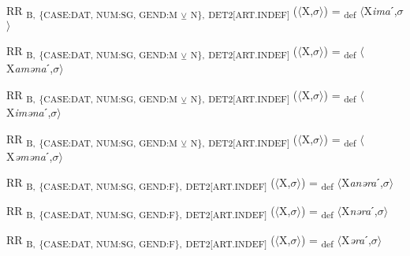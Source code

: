 {\begin{exe}
 RR \textsubscript{B,} \textsubscript{\{CASE:DAT, NUM:SG, GEND:M} \textsubscript{${\veebar}$}\textsubscript{ N\},} \textsubscript{DET2[ART.INDEF]} ($\langle$X,$\sigma $$\rangle$) = \textsubscript{def} $\langle$X\textit{ima}ˊ,$\sigma $$\rangle$
\end{exe}

\begin{exe}
 RR \textsubscript{B,} \textsubscript{\{CASE:DAT, NUM:SG, GEND:M} \textsubscript{${\veebar}$}\textsubscript{ N\},} \textsubscript{DET2[ART.INDEF]} ($\langle$X,$\sigma $$\rangle$) = \textsubscript{def} $\langle$X\textit{aməna}ˊ,$\sigma $$\rangle$
\end{exe}

\begin{exe}
 RR \textsubscript{B,} \textsubscript{\{CASE:DAT, NUM:SG, GEND:M} \textsubscript{${\veebar}$}\textsubscript{ N\},} \textsubscript{DET2[ART.INDEF]} ($\langle$X,$\sigma $$\rangle$) = \textsubscript{def} $\langle$X\textit{iməna}ˊ,$\sigma $$\rangle$
\end{exe}

\begin{exe}
 RR \textsubscript{B,} \textsubscript{\{CASE:DAT, NUM:SG, GEND:M} \textsubscript{${\veebar}$}\textsubscript{ N\},} \textsubscript{DET2[ART.INDEF]} ($\langle$X,$\sigma $$\rangle$) = \textsubscript{def} $\langle$X\textit{əməna}ˊ,$\sigma $$\rangle$
\end{exe}

\begin{exe}
 RR \textsubscript{B,} \textsubscript{\{CASE:DAT, NUM:SG, GEND:F\},} \textsubscript{DET2[ART.INDEF]} ($\langle$X,$\sigma $$\rangle$) = \textsubscript{def} $\langle$X\textit{anəra}ˊ,$\sigma $$\rangle$
\end{exe}

\begin{exe}
 RR \textsubscript{B,} \textsubscript{\{CASE:DAT, NUM:SG, GEND:F\},} \textsubscript{DET2[ART.INDEF]} ($\langle$X,$\sigma $$\rangle$) = \textsubscript{def} $\langle$X\textit{nəra}ˊ,$\sigma $$\rangle$
\end{exe}

\begin{exe}
 RR \textsubscript{B,} \textsubscript{\{CASE:DAT, NUM:SG, GEND:F\},} \textsubscript{DET2[ART.INDEF]} ($\langle$X,$\sigma $$\rangle$) = \textsubscript{def} $\langle$X\textit{əra}ˊ,$\sigma $$\rangle$
\end{exe}

}
